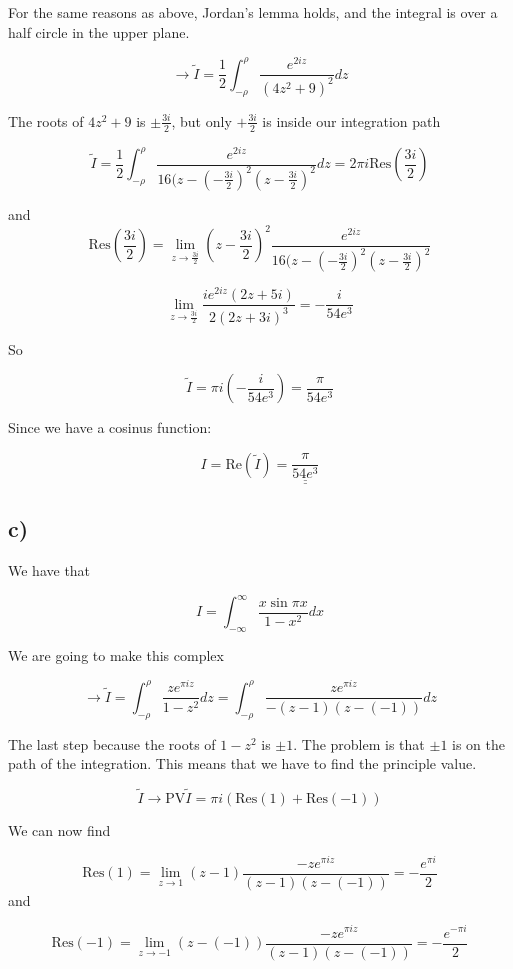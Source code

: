 \documentclass[a4paper,norsk, 10pt]{article}
\begin{document}
For the same reasons as above, Jordan's lemma holds, and the integral is over a half circle in the upper plane. 

$$
\rightarrow \tilde{I} = \frac{1}{2}\int_{-\rho}^{\rho}\frac{e^{2iz}}{(4z^2 +9)^2}dz
$$

The roots of $4z^2 + 9$ is $\pm \frac{3i}{2}$, but only $+\frac{3i}{2}$ is inside our integration path

$$
\tilde{I} = \frac{1}{2}\int_{-\rho}^{\rho}\frac{e^{2iz}}{16(z - (-\frac{3i}{2})^2(z-\frac{3i}{2})^2} dz = 2\pi i \mathrm{Res}(\frac{3i}{2})
$$

and
$$
\mathrm{Res}\left(\frac{3i}{2}\right) = \lim_{z\rightarrow \frac{3i}{2}} (z - \frac{3i}{2})^2 \frac{e^{2iz}}{16(z - (-\frac{3i}{2})^2(z-\frac{3i}{2})^2}
$$

$$
\lim_{z\rightarrow \frac{3i}{2}} \frac{ie^{2iz}(2z+5i)}{2(2z+3i)^3} = -\frac{i}{54e^3}
$$

So 

$$
\tilde{I} = \pi i(-\frac{i}{54e^3}) = \frac{\pi}{54e^3}
$$

Since we have a cosinus function:

$$
I = \mathrm{Re}(\tilde{I}) = \underline{\underline{\frac{\pi}{54e^3}}}
$$

\subsection*{c)}

We have that

$$
I = \int_{-\infty}^{\infty} \frac{x \sin \pi x}{1-x^2} dx
$$

We are going to make this complex

$$
\rightarrow \tilde{I} = \int_{-\rho}^{\rho} \frac{ze^{\pi iz}}{1-z^2} dz = \int_{-\rho}^{\rho} \frac{ze^{\pi iz}}{-(z-1)(z-(-1))} dz
$$

The last step because the roots of $1-z^2$ is $\pm 1$. The problem is that $\pm 1 $ is on the path of the integration. This means that we have to find the principle value.

$$
\tilde{I} \rightarrow \mathrm{PV}\tilde{I} = \pi i(\mathrm{Res}(1) + \mathrm{Res}(-1))
$$

We can now find

$$
\mathrm{Res}(1) = \lim_{z\rightarrow 1} (z-1)  \frac{-ze^{\pi iz}}{(z-1)(z-(-1))} = -\frac{e^{\pi i}}{2}
$$
and

$$
\mathrm{Res}(-1) = \lim_{z\rightarrow -1} (z-(-1))  \frac{-ze^{\pi iz}}{(z-1)(z-(-1))} = -\frac{e^{-\pi i}}{2}
$$
\end{document}
